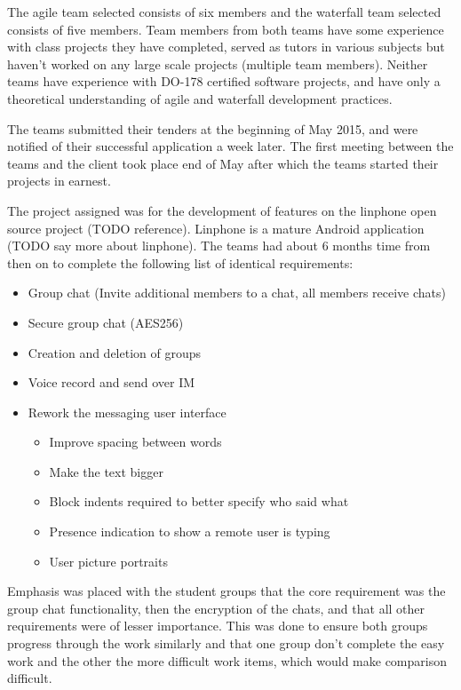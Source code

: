 \documentclass{sig-alternate-05-2015}
\begin{document}
The agile team selected consists of six members and the waterfall team selected consists of five members. Team members from both teams have some experience with class projects they have completed, served as tutors in various subjects but haven't worked on any large scale projects (multiple team members). Neither teams have experience with DO-178 certified software projects, and have only a theoretical understanding of agile and waterfall development practices.  

The teams submitted their tenders at the beginning of May 2015, and were notified of their successful application a week later. The first meeting between the teams and the client took place end of May after which the teams started their projects in earnest. 


The project  assigned was for the development of features on the linphone open source project (TODO reference). Linphone is a mature Android application (TODO say more about linphone). The teams had about 6 months time from then on to complete the following list of identical requirements:
\\
\begin{itemize}
	\item Group chat (Invite additional members to a chat, all members receive chats)
	\item Secure group chat (AES256)
	\item Creation and deletion of groups
	\item Voice record and send over IM
	\item Rework the messaging user interface
	\begin{itemize}
		\item Improve spacing between words
		\item Make the text bigger
		\item Block indents required to better specify who said what
		\item Presence indication to show a remote user is typing
		\item User picture portraits
	\end{itemize}
\end{itemize}

Emphasis was placed with the student groups that the core requirement was the group chat functionality, then the encryption of the chats, and that all other requirements were of lesser importance. This was done to ensure both groups progress through the work similarly and that one group don't complete the easy work and the other the more difficult work items, which would make comparison difficult.  
\end{document}
